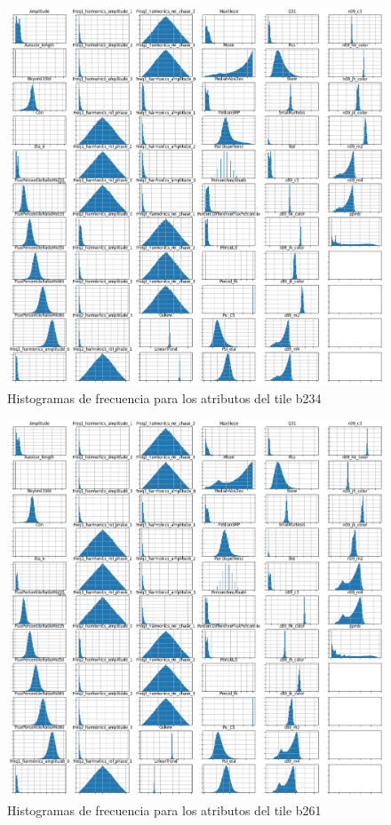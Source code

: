 \begin{appendix}
\begin{figure}[h!]
  \includegraphics[width=\textwidth]{Kap6/allfeatures_b234.png}
  \caption{Histogramas de frecuencia para los atributos del tile b234}
\end{figure}

\begin{figure}[h!]
  \includegraphics[width=\textwidth]{Kap6/allfeatures_b261.png}
    \caption{Histogramas de frecuencia para los atributos del tile b261}
\end{figure}


\end{appendix}
